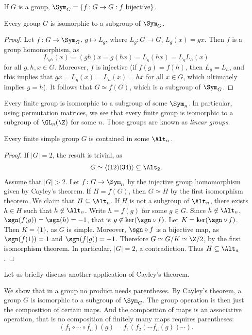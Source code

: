 If $G$ is a group, $\Sym_G=\{f\colon G\to G:f\text{ bijective}\}$.

\begin{theorem}[Cayley]
\label{thm:Cayley}
Every group $G$ is isomorphic to a subgroup of $\Sym_G$.
\end{theorem}

\begin{proof}
Let $f\colon G\to\Sym_G$, $g\mapsto L_g$, where $L_g\colon G\to G$, $L_g(x)=gx$. Then $f$ is a group homomorphism, as 
\[
L_{gh}(x)=(gh)x=g(hx)=L_g(hx)=L_gL_h(x)
\]
for all $g,h,x\in G$. Moreover, $f$ is injective (if $f(g)=f(h)$, then $L_g=L_h$, and this implies that 
$gx=L_g(x)=L_h(x)=hx$ for all $x\in G$, which ultimately implies $g=h$).
It follows that $G\simeq f(G)$, which is a subgroup of $\Sym_G$. 
\end{proof}

Every finite group is isomorphic to a subgroup of some 
$\Sym_n$. 
In particular, using permutation matrices, 
we see that every finite group is 
isomorphic to a subgroup of $\GL_n(\Z)$ for some $n$.
Those groups are known as \emph{linear groups}.

\begin{optional}
\begin{proposition}
Every finite simple group $G$ is contained in some $\Alt_n$.
\end{proposition}

\begin{proof}
If $|G|=2$, the result is trivial, as 
\[
G\simeq\langle (12)(34)\rangle\subseteq\Alt_2.
\]
Assume 
that $|G|>2$.
Let $f\colon G\to\Sym_n$ by the injective group homomorphism
given by Cayley's theorem. If $H=f(G)$, then 
$G\simeq H$ by the first isomorphism theorem. 
We claim that $H\subseteq\Alt_n$. If
$H$ is not a subgroup of $\Alt_n$, there exists $h\in H$ such that  $h\not\in\Alt_n$. Write $h=f(g)$ for some 
$g\in G$. Since $h\not\in\Alt_n$,
$\sgn(f(g))=\sgn(h)=-1$, that is 
$g\not\in\ker(\sgn\circ f)$.
Let $K=\ker(\sgn\circ f)$. Then $K=\{1\}$, as $G$ is simple. Moreover, $\sgn\circ f$ is a bijective map, as
$\sgn(f(1))=1$ and $\sgn(f(g))=-1$. Therefore 
$G\simeq G/K\simeq\Z/2$, by the first isomorphism theorem.  
In particular, $|G|=2$, a contradiction. Thus $H\subseteq\Alt_n$.
\end{proof}
\end{optional}


Let us briefly discuss another application of Cayley’s theorem. 

\begin{optional}
We show that in a group no product needs parentheses. By Cayley’s theorem, a group  $G$  is isomorphic to a subgroup of $\Sym_G$. The group operation is then just the composition of certain maps. And the composition of maps is an associative operation, that is no composition of finitely many maps requires parentheses: 
\[
(f_1\circ\cdots\circ f_n)(g)=f_1(f_2(\cdots f_n(g))\cdots).
\]
\end{optional}
